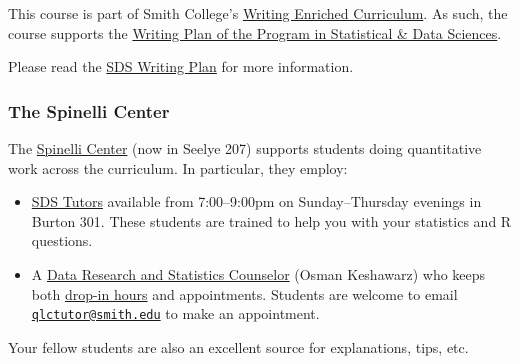 \documentclass[
  letterpaper,
  DIV=11,
  numbers=noendperiod]{scrartcl}
\providecommand{\tightlist}{%
  \setlength{\itemsep}{0pt}\setlength{\parskip}{0pt}}\usepackage{longtable,booktabs,array}
\begin{document}
This course is part of Smith College's
\href{https://www.smith.edu/academics/jacobson-center/writing-enriched-curriculum}{Writing
Enriched Curriculum}. As such, the course supports the
\href{https://www.smith.edu/sites/default/files/media/Documents/Jacobson-Center/SDS-WritingPlan-accessible.pdf}{Writing
Plan of the Program in Statistical \& Data Sciences}.

Please read the
\href{https://www.smith.edu/sites/default/files/media/Documents/Jacobson-Center/SDS-WritingPlan-accessible.pdf}{SDS
Writing Plan} for more information.

\hypertarget{the-spinelli-center}{%
\subsubsection{The Spinelli Center}\label{the-spinelli-center}}

The \href{https://www.smith.edu/qlc/index.html}{Spinelli Center} (now in
Seelye 207) supports students doing quantitative work across the
curriculum. In particular, they employ:

\begin{itemize}
\tightlist
\item
  \href{https://www.smith.edu/qlc/tutoring.html?colStats=open\#PanelStats}{SDS
  Tutors} available from 7:00--9:00pm on Sunday--Thursday evenings in
  Burton 301. These students are trained to help you with your
  statistics and R questions.
\item
  A
  \href{https://www.smith.edu/qlc/tutoring.html?colDataCnslr=open\#PanelDataCnslr}{Data
  Research and Statistics Counselor} (Osman Keshawarz) who keeps both
  \href{http://www.smith.edu/qlc/tutoring.html\#D1}{drop-in hours} and
  appointments. Students are welcome to email
  \href{mailto:qlctutor@smith.edu}{\nolinkurl{qlctutor@smith.edu}} to
  make an appointment.
\end{itemize}

Your fellow students are also an excellent source for explanations,
tips, etc.
\end{document}

